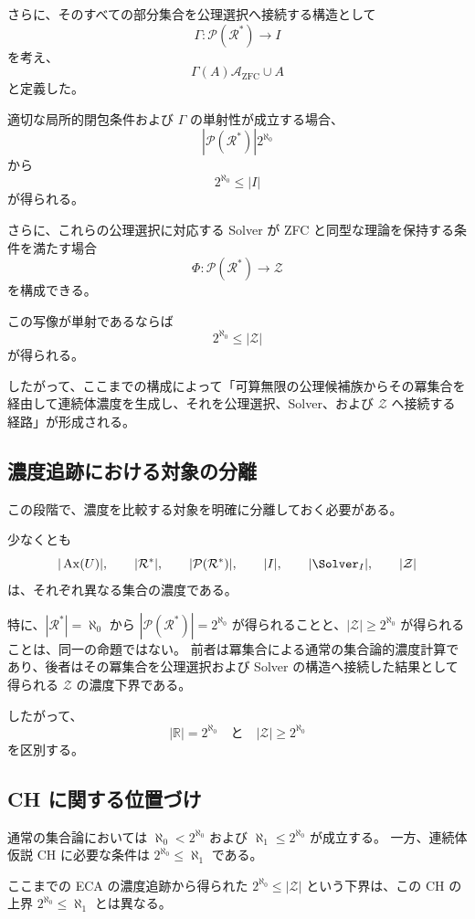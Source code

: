 \documentclass[a4paper,11pt]{article}
\begin{document}
さらに、そのすべての部分集合を公理選択へ接続する構造として
\[
\Gamma:
\mathcal{P}(\mathcal{R}^*)
\longrightarrow
I
\]
を考え、
\[
\Gamma(A)

\mathcal{A}_{\mathrm{ZFC}}\cup A
\]
と定義した。

適切な局所的閉包条件および $\Gamma$ の単射性が成立する場合、
\[
|\mathcal{P}(\mathcal{R}^*)|

2^{\aleph_0}
\]
から
\[
2^{\aleph_0}\leq |I|
\]
が得られる。

さらに、これらの公理選択に対応する Solver が ZFC と同型な理論を保持する条件を満たす場合
\[
\Phi:
\mathcal{P}(\mathcal{R}^*)
\longrightarrow
\mathcal{Z}
\]
を構成できる。

この写像が単射であるならば
\[
\boxed{
2^{\aleph_0}\leq|\mathcal{Z}|
}
\]
が得られる。

したがって、ここまでの構成によって「可算無限の公理候補族からその冪集合を経由して連続体濃度を生成し、それを公理選択、Solver、および $\mathcal{Z}$ へ接続する経路」が形成される。

\subsection{濃度追跡における対象の分離}
この段階で、濃度を比較する対象を明確に分離しておく必要がある。

少なくとも
\[
|\operatorname{Ax}(U)|,
\qquad
|\mathcal{R}^*|,
\qquad
|\mathcal{P}(\mathcal{R}^*)|,
\qquad
|I|,
\qquad
|\Solver_I|,
\qquad
|\mathcal{Z}|
\]
は、それぞれ異なる集合の濃度である。

特に、$|\mathcal{R}^*|=\aleph_0$ から $|\mathcal{P}(\mathcal{R}^*)|=2^{\aleph_0}$ が得られることと、$|\mathcal{Z}|\geq2^{\aleph_0}$ が得られることは、同一の命題ではない。
前者は冪集合による通常の集合論的濃度計算であり、後者はその冪集合を公理選択および Solver の構造へ接続した結果として得られる $\mathcal{Z}$ の濃度下界である。

したがって、
\[
\boxed{
|\mathbb{R}|=2^{\aleph_0}
\quad\text{と}\quad
|\mathcal{Z}|\geq2^{\aleph_0}
}
\]
を区別する。

\subsection{CH に関する位置づけ}
通常の集合論においては $\aleph_0<2^{\aleph_0}$ および $\aleph_1\leq2^{\aleph_0}$ が成立する。
一方、連続体仮説 $\mathrm{CH}$ に必要な条件は $2^{\aleph_0}\leq\aleph_1$ である。

ここまでの ECA の濃度追跡から得られた $2^{\aleph_0}\leq|\mathcal{Z}|$ という下界は、この CH の上界 $2^{\aleph_0}\leq\aleph_1$ とは異なる。
\end{document}

